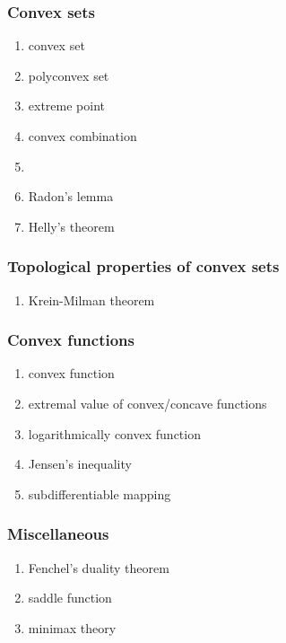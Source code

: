 \documentclass[12pt]{article}
\begin{document}
\subsubsection{Convex sets}
\begin{enumerate}
\item convex set
\item polyconvex set
\item extreme point
\item convex combination
\item {}
\item Radon's lemma
\item Helly's theorem
\end{enumerate}

\subsubsection{Topological properties of convex sets}
\begin{enumerate}
\item Krein-Milman theorem 
\end{enumerate}

\subsubsection{Convex functions}
\begin{enumerate}
\item convex function
\item extremal value of convex/concave functions
\item logarithmically convex function 
\item Jensen's inequality 
\item subdifferentiable mapping 
\end{enumerate}

\subsubsection{Miscellaneous}
\begin{enumerate}
\item Fenchel's duality theorem
\item saddle function
\item minimax theory
\end{enumerate}
\end{document}
